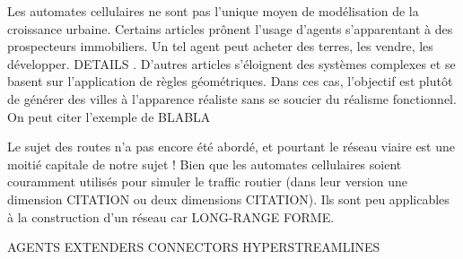 \documentclass[10pt]{article}
\begin{document}
\begin{multicols}{2}
Les automates cellulaires ne sont pas l'unique moyen de modélisation
de la croissance urbaine. Certains articles
\cite{Lechnera,Lechner2004} prônent l'usage d'agents s'apparentant à
des prospecteurs immobiliers. Un tel agent peut acheter des terres,
les vendre, les développer. DETAILS . D'autres articles s'éloignent
des systèmes complexes et se basent sur l'application de règles
géométriques. Dans ces cas, l'objectif est plutôt de générer des
villes à l'apparence réaliste sans se soucier du réalisme
fonctionnel. On peut citer l'exemple de BLABLA

Le sujet des routes n'a pas encore été abordé, et pourtant le réseau
viaire est une moitié capitale de notre sujet ! Bien que les automates
cellulaires soient couramment utilisés pour simuler le traffic routier
(dans leur version une dimension CITATION ou deux dimensions
CITATION). Ils sont peu applicables à la construction d'un réseau car
LONG-RANGE FORME.

AGENTS EXTENDERS CONNECTORS
HYPERSTREAMLINES

\end{multicols}

\begin{figure}



  \caption{}
  \label{}

\end{figure}

\printbibliography
\end{document}
